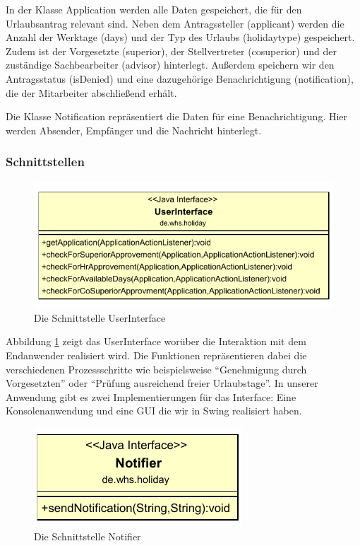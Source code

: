 In der Klasse Application werden alle Daten gespeichert, die für den Urlaubsantrag relevant sind. Neben dem Antragssteller (applicant) werden die Anzahl der Werktage (days) und der Typ des Urlaubs (holidaytype) gespeichert. Zudem ist der Vorgesetzte (superior), der Stellvertreter (cosuperior) und der zuständige Sachbearbeiter (advisor) hinterlegt. Außerdem speichern wir den Antragsstatus (isDenied) und eine dazugehörige Benachrichtigung (notification), die der Mitarbeiter abschließend erhält.

Die Klasse Notification repräsentiert die Daten für eine Benachrichtigung. Hier werden Absender, Empfänger und die Nachricht hinterlegt. 

\subsubsection{Schnittstellen}
\label{subsubsec:Schnittstellen}
\begin{figure}[H]
\centering
\includegraphics[width=0.7\linewidth]{Bilder/SchnittstelleUserInterface}
\caption{Die Schnittstelle UserInterface}
\label{fig:SchnittstelleUserInterface}
\end{figure}

Abbildung \ref{fig:SchnittstelleUserInterface} zeigt das UserInterface worüber die Interaktion mit dem Endanwender realisiert wird. Die Funktionen repräsentieren dabei die verschiedenen Prozessschritte wie beispielsweise "`Genehmigung durch Vorgesetzten"' oder "`Prüfung ausreichend freier Urlaubstage"'. In unserer Anwendung gibt es zwei Implementierungen für das Interface: Eine Konsolenanwendung und eine GUI die wir in Swing realisiert haben.

\begin{figure}[H]
\centering
\includegraphics[width=0.35\linewidth]{Bilder/SchnittstelleNotifier}
\caption{Die Schnittstelle Notifier}
\label{fig:SchnittstelleNotifier}
\end{figure}

